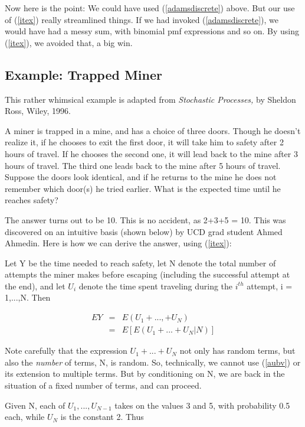 \documentclass[11pt]{article}
\begin{document}
Now here is the point:  We could have used (\ref{adamsdiscrete}) above.
But our use of (\ref{itex}) really streamlined things.  If we had
invoked (\ref{adamsdiscrete}), we would have had a messy sum, with
binomial pmf expressions and so on.  By using (\ref{itex}), we avoided
that, a big win.

\subsection{Example:  Trapped Miner}
\label{trappedminer}

This rather whimsical example is adapted from \textit{Stochastic
Processes,} by Sheldon Ross, Wiley, 1996.

A miner is trapped in a mine, and has a choice of three doors.  Though
he doesn't realize it, if he chooses to exit the first door, it will
take him to safety after 2 hours of travel.  If he chooses the second
one, it will lead back to the mine after 3 hours of travel. The third
one leads back to the mine after 5 hours of travel. Suppose the doors
look identical, and if he returns to the mine he does not remember which
door(s) he tried earlier. What is the expected time until he reaches
safety?

The answer turns out to be 10.  This is no accident, as 2+3+5 = 10.
This was discovered on an intuitive basis (shown below) by UCD grad
student Ahmed Ahmedin.  Here is how we can derive the answer, using
(\ref{itex}):

Let Y be the time needed to reach safety, let N denote the total
number of attempts the miner makes before escaping (including the
successful attempt at the end), and let $U_i$ denote the time spent
traveling during the $i^{th}$ attempt, i = 1,...,N.  Then

\begin{eqnarray}
EY &=& E(U_1+...,+U_N) \\ 
&=& E \left [ E(U_1+...+U_N | N) \right ] 
\end{eqnarray}

Note carefully that the expression $U_1+...+U_N$ not only has random
terms, but also the {\it number} of terms, N, is random.  So,
technically, we cannot use (\ref{aubv}) or its extension to multiple
terms.  But by conditioning on N, we are back in the situation of a
fixed number of terms, and can proceed.

Given N, each of $U_1,...,U_{N-1}$ takes on the values 3 and 5, with
probability 0.5 each, while $U_N$ is the constant 2.  Thus
\end{document}
